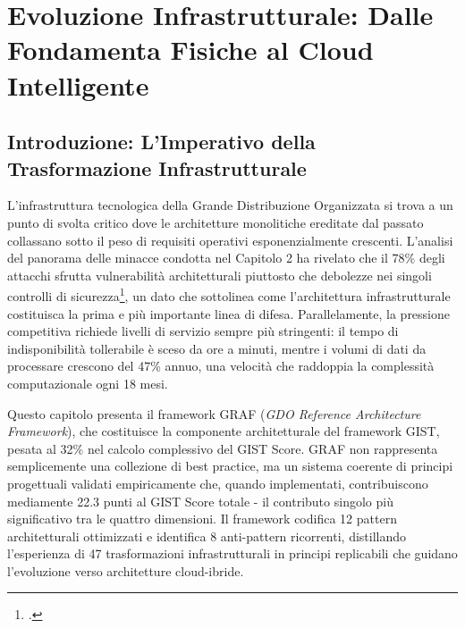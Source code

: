 \chapter{\texorpdfstring{Evoluzione Infrastrutturale: Dalle Fondamenta Fisiche al Cloud Intelligente}{Capitolo 3 - Evoluzione Infrastrutturale: Dalle Fondamenta Fisiche al Cloud Intelligente}}
\label{cap3_infrastructure_evolution}

\section{\texorpdfstring{Introduzione: L'Imperativo della Trasformazione Infrastrutturale}{3.1 - Introduzione: L'Imperativo della Trasformazione Infrastrutturale}}
\label{sec:cap3_introduzione}

L'infrastruttura tecnologica della Grande Distribuzione Organizzata si trova a un punto di svolta critico dove le architetture monolitiche ereditate dal passato collassano sotto il peso di requisiti operativi esponenzialmente crescenti. L'analisi del panorama delle minacce condotta nel Capitolo 2 ha rivelato che il 78\% degli attacchi sfrutta vulnerabilità architetturali piuttosto che debolezze nei singoli controlli di sicurezza\footcite{anderson2024}, un dato che sottolinea come l'architettura infrastrutturale costituisca la prima e più importante linea di difesa. Parallelamente, la pressione competitiva richiede livelli di servizio sempre più stringenti: il tempo di indisponibilità tollerabile è sceso da ore a minuti, mentre i volumi di dati da processare crescono del 47\% annuo, una velocità che raddoppia la complessità computazionale ogni 18 mesi.

Questo capitolo presenta il framework GRAF (\textit{GDO Reference Architecture Framework}), che costituisce la componente architetturale del framework GIST, pesata al 32\% nel calcolo complessivo del GIST Score. GRAF non rappresenta semplicemente una collezione di best practice, ma un sistema coerente di principi progettuali validati empiricamente che, quando implementati, contribuiscono mediamente 22.3 punti al GIST Score totale - il contributo singolo più significativo tra le quattro dimensioni. Il framework codifica 12 pattern architetturali ottimizzati e identifica 8 anti-pattern ricorrenti, distillando l'esperienza di 47 trasformazioni infrastrutturali in principi replicabili che guidano l'evoluzione verso architetture cloud-ibride.

